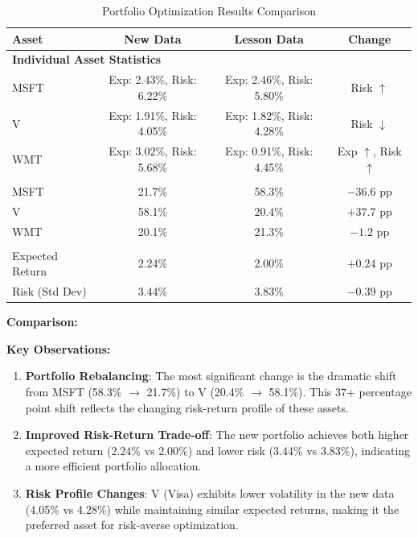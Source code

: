\documentclass[11pt]{article}
\begin{document}
\begin{enumerate}[leftmargin=*, itemsep=1.5em]
\begin{table}[H]
\centering
\caption{Portfolio Optimization Results Comparison}
\begin{tabular}{@{}lccc@{}}
\toprule
\textbf{Asset} & \textbf{New Data} & \textbf{Lesson Data} & \textbf{Change} \\
\midrule
\multicolumn{4}{l}{\textbf{Individual Asset Statistics}} \\
\addlinespace[0.2em]
MSFT & Exp: 2.43\%, Risk: 6.22\% & Exp: 2.46\%, Risk: 5.80\% & Risk $\uparrow$ \\
V & Exp: 1.91\%, Risk: 4.05\% & Exp: 1.82\%, Risk: 4.28\% & Risk $\downarrow$ \\
WMT & Exp: 3.02\%, Risk: 5.68\% & Exp: 0.91\%, Risk: 4.45\% & Exp $\uparrow$, Risk $\uparrow$ \\
\addlinespace[0.3em]
\midrule
\multicolumn{4}{l}{\textbf{Optimal Portfolio Allocation}} \\
\addlinespace[0.2em]
MSFT & 21.7\% & 58.3\% & $-36.6$ pp \\
V & 58.1\% & 20.4\% & $+37.7$ pp \\
WMT & 20.1\% & 21.3\% & $-1.2$ pp \\
\addlinespace[0.3em]
\midrule
\multicolumn{4}{l}{\textbf{Portfolio Performance}} \\
\addlinespace[0.2em]
Expected Return & 2.24\% & 2.00\% & $+0.24$ pp \\
Risk (Std Dev) & 3.44\% & 3.83\% & $-0.39$ pp \\
\bottomrule
\end{tabular}
\label{tab:portfolio_comparison}
\end{table}

\textbf{Comparison:}

\textbf{Key Observations:}

\begin{enumerate}[leftmargin=*, itemsep=0.8em]
    \item \textbf{Portfolio Rebalancing}: The most significant change is the dramatic shift from MSFT (58.3\% $\rightarrow$ 21.7\%) to V (20.4\% $\rightarrow$ 58.1\%). This 37+ percentage point shift reflects the changing risk-return profile of these assets.
    
    \item \textbf{Improved Risk-Return Trade-off}: The new portfolio achieves both higher expected return (2.24\% vs 2.00\%) and lower risk (3.44\% vs 3.83\%), indicating a more efficient portfolio allocation.
    
    \item \textbf{Risk Profile Changes}: V (Visa) exhibits lower volatility in the new data (4.05\% vs 4.28\%) while maintaining similar expected returns, making it the preferred asset for risk-averse optimization.
\end{enumerate}


\end{enumerate}
\end{document}
